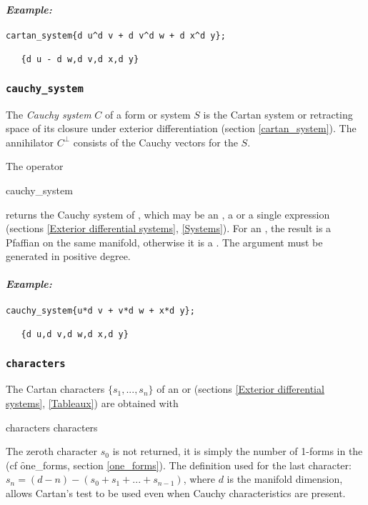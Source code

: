 \paragraph{\it Example:}
\begin{verbatim}
cartan_system{d u^d v + d v^d w + d x^d y};

   {d u - d w,d v,d x,d y}
\end{verbatim}

\subsubsection{\tt cauchy\_system}
\label{cauchy_system}

The {\em Cauchy system} $C$ of a form or system $S$ is the Cartan system or
retracting space of its closure under exterior differentiation (section
\ref{cartan_system}). The annihilator $C^\perp$ consists of the Cauchy
vectors for the $S$.

The operator
\begin{edssyntax}
	cauchy\_system 
\end{edssyntax}
returns the Cauchy system of , which may be an , a
 or a single  expression (sections \ref{Exterior
differential systems}, \ref{Systems}). For an , the result is a
Pfaffian  on the same manifold, otherwise it is a
. The argument must be generated in positive degree.

\paragraph{\it Example:}
\begin{verbatim}
cauchy_system{u*d v + v*d w + x*d y};

   {d u,d v,d w,d x,d y}
\end{verbatim}

\subsubsection{\tt characters}
\label{characters}

The Cartan characters $\{s_1,...,s_n\}$ of an  or 
(sections \ref{Exterior differential systems}, \ref{Tableaux}) are obtained
with
\begin{edssyntax}
	characters  \qquad characters 
\end{edssyntax}
The zeroth character $s_0$ is not returned, it is simply the number of
1-forms in the  (cf \f{one\_forms}, section \ref{one_forms}). The
definition used for the last character: $s_n = (d - n) - (s_0 + s_1 + ... +
s_{n-1})$, where $d$ is the manifold dimension, allows Cartan's test to be
used even when Cauchy characteristics are present.

